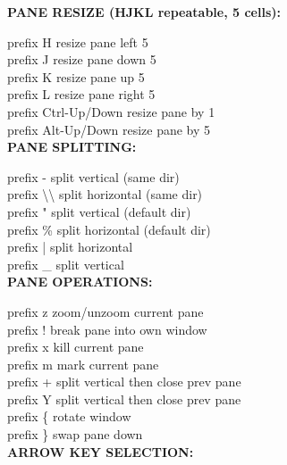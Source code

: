 \documentclass[11pt,a4paper,twoside]{book}
\begin{document}
\vspace{12pt}
{\bfseries\color{neonyellow} PANE RESIZE (HJKL repeatable, 5 cells):}\vspace{4pt}

prefix H              resize pane left 5\\
prefix J              resize pane down 5\\
prefix K              resize pane up 5\\
prefix L              resize pane right 5\\
prefix Ctrl-Up/Down   resize pane by 1\\
prefix Alt-Up/Down    resize pane by 5\\


\vspace{12pt}
{\bfseries\color{neonyellow} PANE SPLITTING:}\vspace{4pt}

prefix -              split vertical (same dir)\\
prefix \textbackslash{}\textbackslash{}              split horizontal (same dir)\\
prefix "              split vertical (default dir)\\
prefix \%              split horizontal (default dir)\\
prefix |              split horizontal\\
prefix \_              split vertical\\


\vspace{12pt}
{\bfseries\color{neonyellow} PANE OPERATIONS:}\vspace{4pt}

prefix z              zoom/unzoom current pane\\
prefix !              break pane into own window\\
prefix x              kill current pane\\
prefix m              mark current pane\\
prefix +              split vertical then close prev pane\\
prefix Y              split vertical then close prev pane\\
prefix \{              rotate window\\
prefix \}              swap pane down\\


\vspace{12pt}
{\bfseries\color{neonyellow} ARROW KEY SELECTION:}\vspace{4pt}
\end{document}
